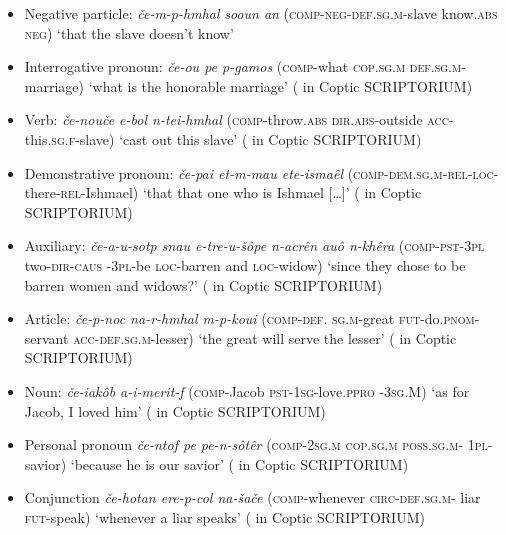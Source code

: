 \documentclass[output=paper,colorlinks,citecolor=brown ,chinesefont]{langscibook}
\begin{document}
\begin{itemize}
\item Negative particle:  \textit{če-m-p-hmhal} \textit{sooun an} (\textsc{comp}-\textsc{neg}-\textsc{def}.\textsc{sg}.\textsc{m}-slave know.\textsc{abs} \textsc{neg}) ‘that the slave doesn’t know'
\item Interrogative pronoun:  \textit{če-ou pe p-gamos} (\textsc{comp}-what \textsc{cop}.\textsc{sg}.\textsc{m} \textsc{def}.\textsc{sg}.\textsc{m}-marriage) ‘what is the honorable marriage' ( in Coptic SCRIPTORIUM)
\item Verb:  \textit{če-nouče e-bol n-tei-hmhal} (\textsc{comp}-throw.\textsc{abs} \textsc{dir}.\textsc{abs}-outside \textsc{acc}-this.\textsc{sg}.\textsc{f}-slave) ‘cast out this slave' ( in Coptic SCRIPTORIUM)
\item Demonstrative pronoun:  \textit{če-pai et-m-mau ete-ismaêl} (\textsc{comp}-\textsc{dem}.\textsc{sg}.\textsc{m}-\textsc{rel}-\textsc{loc}-there-\textsc{rel}-Ishmael) ‘that that one who is Ishmael […]' ( in Coptic SCRIPTORIUM)
\item Auxiliary:  \textit{če-a-u-sotp snau e-tre-u-šôpe n-acrên auô n-khêra} (\textsc{comp}-\textsc{pst}-3\textsc{pl} two-\textsc{dir}-\textsc{caus} -3\textsc{pl}-be \textsc{loc}-barren and \textsc{loc}-widow) ‘since they chose to be barren women and widows?' ( in Coptic SCRIPTORIUM)
\item Article:  \textit{če-p-noc na-r-hmhal m-p-koui} (\textsc{comp}-\textsc{def}. \textsc{sg}.\textsc{m}-great \textsc{fut}-do.\textsc{pnom}-servant \textsc{acc}-\textsc{def}.\textsc{sg}.\textsc{m}-lesser) ‘the great will serve the lesser' ( in Coptic SCRIPTORIUM)
\item Noun:  \textit{če-iakôb a-i-merit-f} (\textsc{comp}-Jacob \textsc{pst}-1\textsc{sg}-love.\textsc{ppro} -3\textsc{sg}.M) ‘as for Jacob, I loved him' ( in Coptic SCRIPTORIUM)
\item Personal pronoun  \textit{če-ntof pe pe-n-sôtêr} (\textsc{comp}-2\textsc{sg}.\textsc{m} \textsc{cop}.\textsc{sg}.\textsc{m} \textsc{poss}.\textsc{sg}.\textsc{m}- 1\textsc{pl}-savior) ‘because he is our savior' ( in Coptic SCRIPTORIUM)
\item Conjunction  \textit{če-hotan ere-p-col na-šače} (\textsc{comp}-whenever \textsc{circ}-\textsc{def}.\textsc{sg}.\textsc{m}- liar \textsc{fut}-speak) ‘whenever a liar speaks' ( in Coptic SCRIPTORIUM)
\end{itemize}
\end{document}
